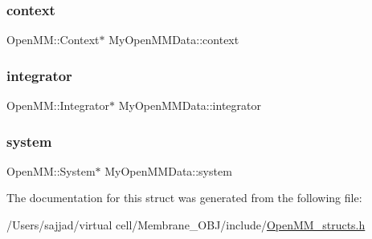 \subsubsection{\texorpdfstring{context}{context}}
{\footnotesize\ttfamily Open\+M\+M\+::\+Context$\ast$ My\+Open\+M\+M\+Data\+::context}

\mbox{\label{structMyOpenMMData_a471489f3c9bd1e5a54fc5202b71b6b96}} 
\subsubsection{\texorpdfstring{integrator}{integrator}}
{\footnotesize\ttfamily Open\+M\+M\+::\+Integrator$\ast$ My\+Open\+M\+M\+Data\+::integrator}

\mbox{\label{structMyOpenMMData_ad14c08e4c616766db92ae52e57b44480}} 
\subsubsection{\texorpdfstring{system}{system}}
{\footnotesize\ttfamily Open\+M\+M\+::\+System$\ast$ My\+Open\+M\+M\+Data\+::system}



The documentation for this struct was generated from the following file\+:\begin{DoxyCompactItemize}
\item 
/\+Users/sajjad/virtual cell/\+Membrane\+\_\+\+O\+B\+J/include/\mbox{\hyperlink{OpenMM__structs_8h}{Open\+M\+M\+\_\+structs.\+h}}\end{DoxyCompactItemize}
